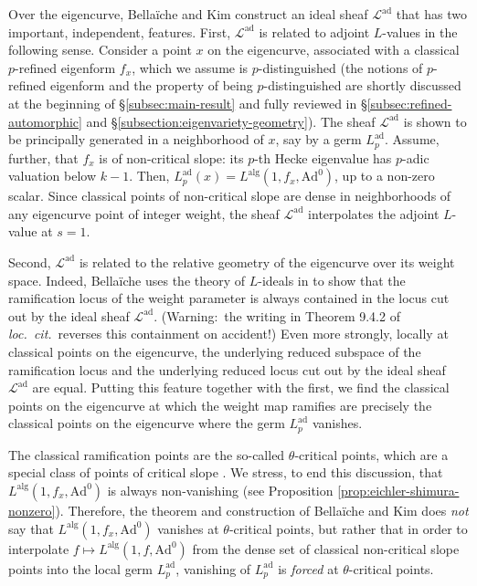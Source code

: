 \documentclass[10pt, twoside]{amsart}
\theoremstyle{plain}
\theoremstyle{definition}
\theoremstyle{remark}
\numberwithin{equation}{subsection}
\def\Ad{\mathrm{Ad}}
\def\alg{\mathrm{alg}}
\def\ad{\operatorname{ad}}
\def\scrl{\mathscr L}
\begin{document}
Over the eigencurve, Bella\"iche and Kim construct an ideal sheaf $\scrl^{\ad}$ that has two important, independent, features. First, $\scrl^{\ad}$ is related to adjoint $L$-values in the following sense. Consider a point $x$ on the eigencurve, associated with a classical $p$-refined eigenform $f_x$, which we assume is $p$-distinguished {(the notions of $p$-refined eigenform and the property of being $p$-distinguished are shortly discussed at the beginning of \S\ref{subsec:main-result} and fully reviewed in \S\ref{subsec:refined-automorphic} and \S\ref{subsection:eigenvariety-geometry})}. 
The sheaf $\scrl^{\ad}$ is shown to be principally generated in a neighborhood of $x$, say by a germ $L_p^{\ad}$. Assume, further, that $f_x$ is of non-critical slope: its $p$-th Hecke eigenvalue has $p$-adic valuation below $k-1$.  Then, $L_p^{\ad}(x)= L^{\alg}(1,f_x,\Ad^0)$, up to a non-zero scalar. Since classical points of non-critical slope are dense in neighborhoods of any eigencurve point of integer weight, the sheaf $\scrl^{\ad}$ interpolates the adjoint $L$-value at $s=1$.

Second, $\scrl^{\ad}$ is related to the relative geometry of the eigencurve over its weight space. Indeed, Bella\"iche uses the theory of $L$-ideals in \cite[Chapter 9]{Bel} to show that the ramification locus of the weight parameter is always contained in the locus cut out by the ideal sheaf $\scrl^{\ad}$. (Warning:\ the writing in Theorem 9.4.2 of {\em loc.\ cit.}\ reverses this containment on accident!) Even more strongly, locally at classical points on the eigencurve, the underlying reduced subspace of the ramification locus and the underlying reduced locus cut out by the ideal sheaf $\scrl^{\ad}$ are equal. Putting this feature together with the first, we find the classical points on the eigencurve at which the weight map ramifies are precisely the classical points on the eigencurve where the germ $L_p^{\ad}$ vanishes. 

The classical ramification points are the so-called $\theta$-critical points, which are a special class of points of critical slope \cite[Theorem 1.1]{Bergdall-CompanionPoints}. We stress, to end this discussion, that $L^{\alg}(1,f_x,\Ad^0)$ is always non-vanishing (see Proposition \ref{prop:eichler-shimura-nonzero}). Therefore, the theorem and construction of Bella\"iche and Kim does {\em not} say that $L^{\alg}(1,f_x,\Ad^0)$ vanishes at $\theta$-critical points, but rather that in order to interpolate $f \mapsto L^{\alg}(1,f,\Ad^0)$ from the dense set of classical non-critical slope points into the local germ $L_p^{\ad}$, vanishing of $L_p^{\ad}$ is {\em forced} at $\theta$-critical points.
\end{document}
